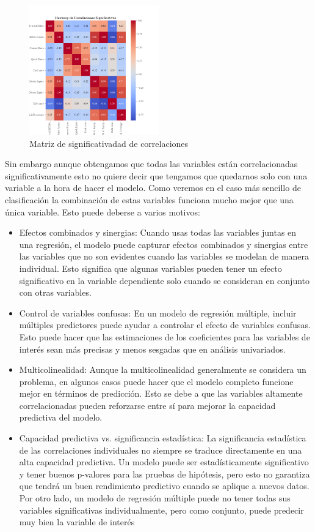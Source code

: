 \documentclass{article}
\begin{document}
\begin{figure}
\centering
\includegraphics[width=0.5\textwidth]{heatmap_correlation.png}
\caption{Matriz de significativadad de correlaciones}
\label{fig:heatmap_correlation}
\end{figure}

Sin embargo aunque obtengamos que todas las variables están correlacionadas significativamente esto no quiere decir que tengamos que quedarnos solo con una variable a la hora de hacer el modelo. Como veremos en el caso más sencillo de clasificación la combinación de estas variables funciona mucho mejor que una única variable. Esto puede deberse a varios motivos:

\begin{itemize}
\item Efectos combinados y sinergias: Cuando usas todas las variables juntas en una regresión, el modelo puede capturar efectos combinados y sinergias entre las variables que no son evidentes cuando las variables se modelan de manera individual. Esto significa que algunas variables pueden tener un efecto significativo en la variable dependiente solo cuando se consideran en conjunto con otras variables.
\item Control de variables confusas: En un modelo de regresión múltiple, incluir múltiples predictores puede ayudar a controlar el efecto de variables confusas. Esto puede hacer que las estimaciones de los coeficientes para las variables de interés sean más precisas y menos sesgadas que en análisis univariados.
\item Multicolinealidad: Aunque la multicolinealidad generalmente se considera un problema, en algunos casos puede hacer que el modelo completo funcione mejor en términos de predicción. Esto se debe a que las variables altamente correlacionadas pueden reforzarse entre sí para mejorar la capacidad predictiva del modelo.
\item Capacidad predictiva vs. significancia estadística: La significancia estadística de las correlaciones individuales no siempre se traduce directamente en una alta capacidad predictiva. Un modelo puede ser estadísticamente significativo y tener buenos p-valores para las pruebas de hipótesis, pero esto no garantiza que tendrá un buen rendimiento predictivo cuando se aplique a nuevos datos. Por otro lado, un modelo de regresión múltiple puede no tener todas sus variables significativas individualmente, pero como conjunto, puede predecir muy bien la variable de interés
\end{itemize}
\end{document}
